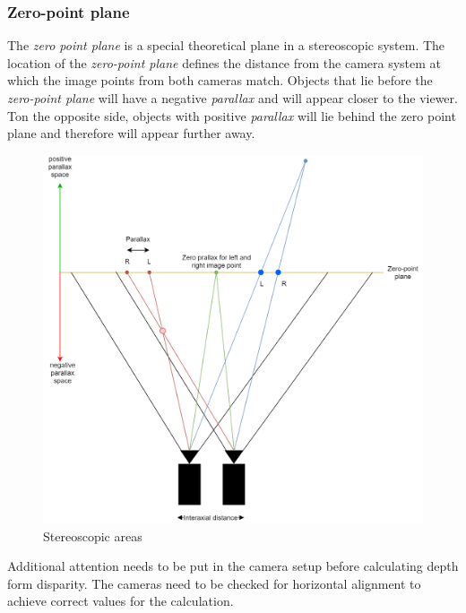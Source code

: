 \subsubsection{Zero-point plane}
The\textit{ zero point plane} is a special theoretical plane in a stereoscopic system. The location of the \textit{zero-point plane} defines the distance from the camera system at which the image points from both cameras match. Objects that lie before the \textit{zero-point plane} will have a negative \textit{parallax} and will appear closer to the viewer. Ton the opposite side, objects with positive \textit{parallax} will lie behind the zero point plane and therefore will appear further away.
\begin{figure}[H]
\includegraphics[width=\textwidth]{images/Stereo_diagram.png}
\caption{Stereoscopic areas}
\label{stereo_diagram} 
\end{figure}
Additional attention needs to be put in the camera setup before calculating depth form disparity. The cameras need to be checked for horizontal alignment to achieve correct values for the calculation.
